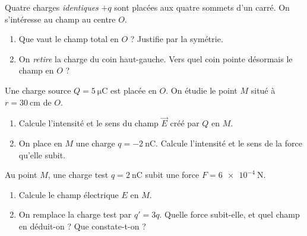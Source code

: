 \documentclass[11pt,a4paper]{article}
\newcommand{\vv}[1]{\vec{#1}}\newcommand{\ds}{\displaystyle}
\begin{document}
\begin{exo}
Quatre charges \emph{identiques} $+q$ sont placées aux quatre sommets d'un carré. On s'intéresse au
champ au centre $O$.
\begin{center}
\end{center}
\begin{enumerate}[label=\alph*)]
  \item Que vaut le champ total en $O$ ? Justifie par la symétrie.
  \item On \emph{retire} la charge du coin haut-gauche. Vers quel coin pointe désormais le champ en
        $O$ ?
\end{enumerate}
\end{exo}

\begin{exo}
Une charge source $Q = \SI{+5}{\micro\coulomb}$ est placée en $O$. On étudie le point $M$ situé à
$r = \SI{30}{\centi\metre}$ de $O$.
\begin{enumerate}[label=\alph*)]
  \item Calcule l'intensité et le sens du champ $\vv{E}$ créé par $Q$ en $M$.
  \item On place en $M$ une charge $q = \SI{-2}{\nano\coulomb}$. Calcule l'intensité et le sens de
        la force qu'elle subit.
\end{enumerate}
\end{exo}

\begin{exo}
Au point $M$, une charge test $q = \SI{+2}{\nano\coulomb}$ subit une force $F = \SI{6e-4}{\newton}$.
\begin{enumerate}[label=\alph*)]
  \item Calcule le champ électrique $E$ en $M$.
  \item On remplace la charge test par $q' = 3q$. Quelle force subit-elle, et quel champ en
        déduit-on ? Que constate-t-on ?
\end{enumerate}
\end{exo}
\end{document}
